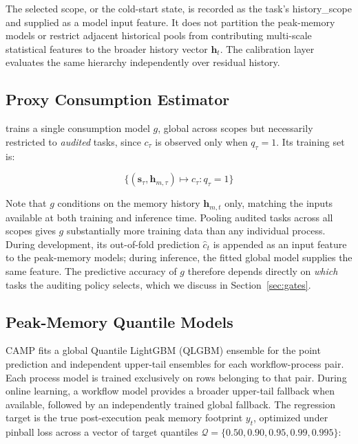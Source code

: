 The selected scope, or the cold-start state, is recorded as the task's history\_scope and supplied as a model input feature. It does not partition the peak-memory models or restrict adjacent historical pools from contributing multi-scale statistical features to the broader history vector $\mathbf{h}_t$. The calibration layer evaluates the same hierarchy independently over residual history.

\subsection{Proxy Consumption Estimator}

\toolname{} trains a single consumption model $g$, global across scopes
but necessarily restricted to \emph{audited} tasks, since $c_\tau$ is
observed only when $q_\tau = 1$. 
Its training set is:

\begin{equation}
\{(\mathbf{s}_\tau, \mathbf{h}_{m,\tau}) \mapsto c_\tau : q_\tau = 1\}
\end{equation}

Note that $g$ conditions on the memory history $\mathbf{h}_{m,t}$ only,
matching the inputs available at both training and inference time.
Pooling audited tasks across all scopes gives $g$ substantially more
training data than any individual process. During development, its
out-of-fold prediction $\hat{c}_t$ is appended as an input feature to the
peak-memory models; during inference, the fitted global model supplies the
same feature. The predictive accuracy of $g$ therefore depends directly on
\emph{which} tasks the auditing policy selects, which we discuss in Section~\ref{sec:gates}.

\subsection{Peak-Memory Quantile Models}

CAMP fits a global Quantile LightGBM (QLGBM) ensemble for the point prediction and independent upper-tail ensembles for each workflow-process pair. Each process model is trained exclusively on rows belonging to that pair. During online learning, a workflow model provides a broader upper-tail fallback when available, followed by an independently trained global fallback. The regression target is the true post-execution peak memory footprint $y_t$, optimized under pinball loss across a vector of target quantiles $\mathcal{Q} = \{0.50, 0.90, 0.95, 0.99, 0.995\}$:

